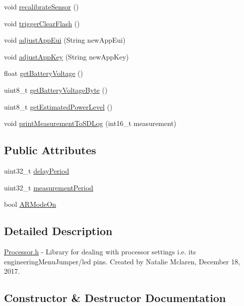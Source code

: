 \begin{DoxyCompactItemize}
void \mbox{\hyperlink{class_processor_ae18acf2c55d0a3bcd7412f86d388808d}{recalibrate\+Sensor}} ()
\item 
void \mbox{\hyperlink{class_processor_a8083069e032fcd6e38c97cc31475200a}{trigger\+Clear\+Flash}} ()
\item 
void \mbox{\hyperlink{class_processor_a9e5c642ce356b8aebe5998158f31ded5}{adjust\+App\+Eui}} (String new\+App\+Eui)
\item 
void \mbox{\hyperlink{class_processor_adee07912124face3700bc988606b8f38}{adjust\+App\+Key}} (String new\+App\+Key)
\item 
float \mbox{\hyperlink{class_processor_aa467c82cb9a57d597487fc319c878c36}{get\+Battery\+Voltage}} ()
\item 
uint8\+\_\+t \mbox{\hyperlink{class_processor_ae2385e41f86895199fb37e524a3f1e86}{get\+Battery\+Voltage\+Byte}} ()
\item 
uint8\+\_\+t \mbox{\hyperlink{class_processor_a78b74d3be91182a263f77ff0f250408d}{get\+Estimated\+Power\+Level}} ()
\item 
void \mbox{\hyperlink{class_processor_aa60b755d3022b3b0f83f654e2b7e2e1d}{print\+Measurement\+To\+S\+D\+Log}} (int16\+\_\+t measurement)
\end{DoxyCompactItemize}
\subsection*{Public Attributes}
\begin{DoxyCompactItemize}
\item 
uint32\+\_\+t \mbox{\hyperlink{class_processor_a3d4df57c57607d2ed3ad9f2d4ff3e789}{delay\+Period}}
\item 
uint32\+\_\+t \mbox{\hyperlink{class_processor_acd8bba113bac81f4c5695cba7c9dd146}{measurement\+Period}}
\item 
bool \mbox{\hyperlink{class_processor_af51b6b3ce7074068195b5d3eb2442fdb}{A\+R\+Mode\+On}}
\end{DoxyCompactItemize}


\subsection{Detailed Description}
\mbox{\hyperlink{_processor_8h}{Processor.\+h}} -\/ Library for dealing with processor settings i.\+e. its engineering\+Menu\+Jumper/led pins. Created by Natalie Mclaren, December 18, 2017. 

\subsection{Constructor \& Destructor Documentation}
\mbox{\label{class_processor_ad7a36124dd65e3ef07efb2e3fc5e7a70}} 
